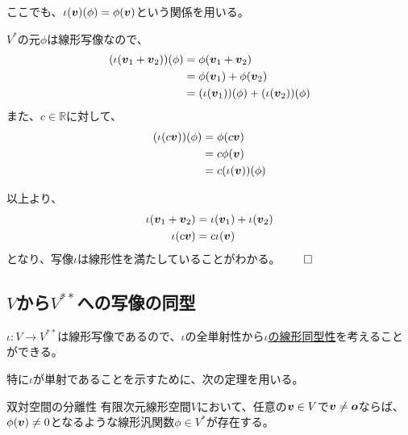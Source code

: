 \documentclass[../../../topic_linear-algebra]{subfiles}
\begin{document}
\begin{handout}
  ここでも、$\iota(\vb*{v})(\phi) = \phi(\vb*{v})$という関係を用いる。
  
  \br
  
  $V^*$の元$\phi$は線形写像なので、
  \begin{align*}
    (\iota(\vb*{v}_1 + \vb*{v}_2))(\phi) &= \phi(\vb*{v}_1 + \vb*{v}_2) \\
    &= \phi(\vb*{v}_1) + \phi(\vb*{v}_2) \\
    &= (\iota(\vb*{v}_1))(\phi) + (\iota(\vb*{v}_2))(\phi)
  \end{align*}
  また、$c \in \mathbb{R}$に対して、
  \begin{align*}
    (\iota(c\vb*{v}))(\phi) &= \phi(c\vb*{v}) \\
    &= c\phi(\vb*{v}) \\
    &= c(\iota(\vb*{v}))(\phi)
  \end{align*}
  
  以上より、
  \begin{align*}
    \iota(\vb*{v}_1 + \vb*{v}_2) &= \iota(\vb*{v}_1) + \iota(\vb*{v}_2) \\
    \iota(c\vb*{v}) &= c\iota(\vb*{v})
  \end{align*}
  となり、写像$\iota$は線形性を満たしていることがわかる。$\qed$
\end{handout}

\subsection{$V$から$V^{**}$への写像の同型}

$\iota \colon V \to V^{**}$は線形写像であるので、$\iota$の全単射性から\hyperref[def:linear-isomorphism]{$\iota$の線形同型性}を考えることができる。

\br

特に$\iota$が単射であることを示すために、次の定理を用いる。

\begin{theorem}{双対空間の分離性}\label{thm:dual-space-separation}
  有限次元線形空間$V$において、任意の$\vb*{v} \in V$で$\vb*{v} \neq \vb*{o}$ならば、$\phi(\vb*{v}) \neq 0$となるような線形汎関数$\phi \in V^*$が存在する。
\end{theorem}
\end{document}

